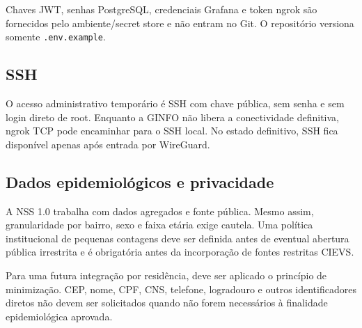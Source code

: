 Chaves JWT, senhas PostgreSQL, credenciais Grafana e token ngrok são fornecidos pelo ambiente/secret store e não entram no Git. O repositório versiona somente \texttt{.env.example}.

\subsection{SSH}

O acesso administrativo temporário é SSH com chave pública, sem senha e sem login direto de root. Enquanto a GINFO não libera a conectividade definitiva, ngrok TCP pode encaminhar para o SSH local. No estado definitivo, SSH fica disponível apenas após entrada por WireGuard.

\subsection{Dados epidemiológicos e privacidade}

A NSS 1.0 trabalha com dados agregados e fonte pública. Mesmo assim, granularidade por bairro, sexo e faixa etária exige cautela. Uma política institucional de pequenas contagens deve ser definida antes de eventual abertura pública irrestrita e é obrigatória antes da incorporação de fontes restritas CIEVS.

Para uma futura integração por residência, deve ser aplicado o princípio de minimização. CEP, nome, CPF, CNS, telefone, logradouro e outros identificadores diretos não devem ser solicitados quando não forem necessários à finalidade epidemiológica aprovada.
